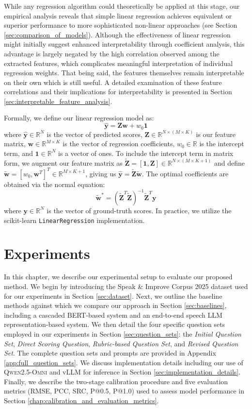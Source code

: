 \documentclass{report}
\begin{document}
While any regression algorithm could theoretically be applied at this stage, our empirical analysis reveals that simple linear regression achieves equivalent or superior performance to more sophisticated non-linear approaches (see Section \ref{sec:comparison_of_models}). Although the effectiveness of linear regression might initially suggest enhanced interpretability through coefficient analysis, this advantage is largely negated by the high correlation observed among the extracted features, which complicates meaningful interpretation of individual regression weights. That being said, the features themselves remain interpretable on their own which is still useful. A detailed examination of these feature correlations and their implications for interpretability is presented in Section \ref{sec:interpretable_feature_analysis}. 

Formally, we define our linear regression model as:
$$
\hat{\mathbf{y}} = \mathbf{Z}\mathbf{w} + w_0 \mathbf{1}
$$
where $\hat{\mathbf{y}} \in \mathbb{R}^N$ is the vector of predicted scores, $\mathbf{Z} \in \mathbb{R}^{N \times (M \times K)}$ is our feature matrix, $\mathbf{w} \in \mathbb{R}^{M \times K}$ is the vector of regression coefficients, $w_0 \in \mathbb{R}$ is the intercept term, and $\mathbf{1} \in \mathbb{R}^N$ is a vector of ones. To include the intercept term in matrix form, we augment our feature matrix as $\tilde{\mathbf{Z}} = [\mathbf{1}, \mathbf{Z}] \in \mathbb{R}^{N \times (M \times K + 1)}$ and define $\tilde{\mathbf{w}} = [w_0, \mathbf{w}^T]^T \in \mathbb{R}^{M \times K + 1}$, giving us $\hat{\mathbf{y}} = \tilde{\mathbf{Z}}\tilde{\mathbf{w}}$. The optimal coefficients are obtained via the normal equation:
$$
\tilde{\mathbf{w}}^* = (\tilde{\mathbf{Z}}^T\tilde{\mathbf{Z}})^{-1}\tilde{\mathbf{Z}}^T\mathbf{y}
$$
where $\mathbf{y} \in \mathbb{R}^N$ is the vector of ground-truth scores. In practice, we utilize the scikit-learn \citep{scikit-learn} \texttt{LinearRegression} implementation.

\chapter{Experiments}
\label{chap:experiments}
In this chapter, we describe our experimental setup to evaluate our proposed method. We begin by introducing the Speak \& Improve Corpus 2025 dataset used for our experiments in Section \ref{sec:dataset}. Next, we outline the baseline methods against which we compare our approach in Section \ref{sec:baselines}, including a cascaded BERT-based system and an end-to-end speech LLM representation-based system. We then detail the four specific question sets employed in our experiments in Section \ref{sec:question_sets}: the \emph{Initial Question Set}, \emph{Direct Scoring Question}, \emph{Rubric-based Question Set}, and \emph{Revised Question Set}. The complete question sets and prompts are provided in Appendix \ref{app:full_question_sets}. We discuss implementation details including our use of \textsc{Qwen2.5-Omni} and vLLM for inference in Section \ref{sec:implementation_details}. Finally, we describe the two-stage calibration procedure and five evaluation metrics (RMSE, PCC, SRC, P@0.5, P@1.0) used to assess model performance in Section \ref{chap:calibration_and_evaluation_metrics}.
\end{document}
